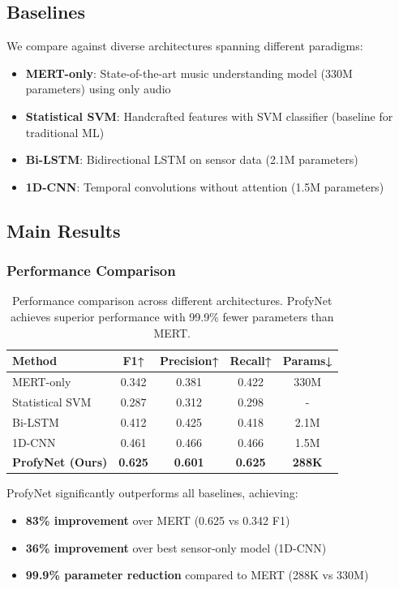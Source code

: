 \subsection{Baselines}

We compare against diverse architectures spanning different paradigms:

\begin{itemize}
\item \textbf{MERT-only}: State-of-the-art music understanding model (330M parameters) using only audio
\item \textbf{Statistical SVM}: Handcrafted features with SVM classifier (baseline for traditional ML)
\item \textbf{Bi-LSTM}: Bidirectional LSTM on sensor data (2.1M parameters)
\item \textbf{1D-CNN}: Temporal convolutions without attention (1.5M parameters)
\end{itemize}

\subsection{Main Results}

\subsubsection{Performance Comparison}

\begin{table}[h]
\centering
\caption{Performance comparison across different architectures. ProfyNet achieves superior performance with 99.9\% fewer parameters than MERT.}
\label{tab:main_results}
\begin{tabular}{lcccc}
\toprule
\textbf{Method} & \textbf{F1↑} & \textbf{Precision↑} & \textbf{Recall↑} & \textbf{Params↓} \\
\midrule
MERT-only & 0.342 & 0.381 & 0.422 & 330M \\
Statistical SVM & 0.287 & 0.312 & 0.298 & - \\
Bi-LSTM & 0.412 & 0.425 & 0.418 & 2.1M \\
1D-CNN & 0.461 & 0.466 & 0.466 & 1.5M \\
\textbf{ProfyNet (Ours)} & \textbf{0.625} & \textbf{0.601} & \textbf{0.625} & \textbf{288K} \\
\bottomrule
\end{tabular}
\end{table}

ProfyNet significantly outperforms all baselines, achieving:
\begin{itemize}
\item \textbf{83\% improvement} over MERT (0.625 vs 0.342 F1)
\item \textbf{36\% improvement} over best sensor-only model (1D-CNN)
\item \textbf{99.9\% parameter reduction} compared to MERT (288K vs 330M)
\end{itemize}

